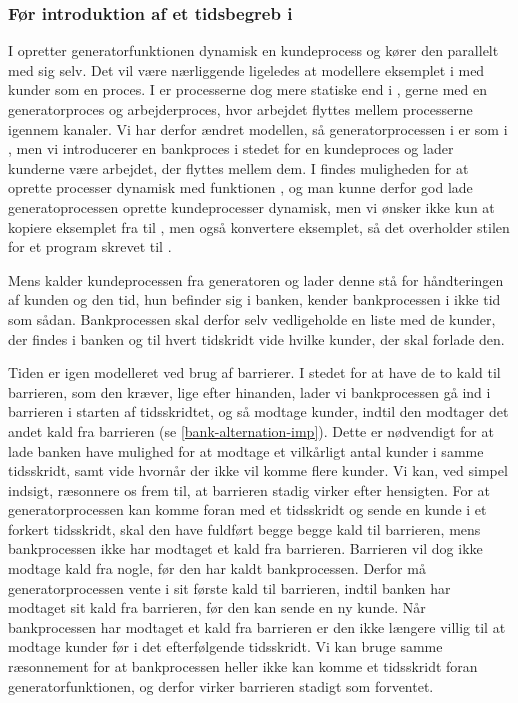\subsubsection{Før introduktion af et tidsbegreb i \pycsp}

I \simpy opretter generatorfunktionen dynamisk en kundeprocess og  kører den parallelt med sig selv. Det vil  være nærliggende ligeledes at 
modellere eksemplet i \pycsp med kunder som en proces. I \pycsp er processerne dog mere statiske end i \simpy, gerne med en generatorproces og 
arbejderproces, hvor  arbejdet flyttes 
mellem processerne igennem kanaler. Vi har derfor ændret modellen, så   
generatorprocessen i \pycsp er som i \simpy, men vi introducerer en bankproces i stedet for en kundeproces og lader kunderne være arbejdet, der flyttes mellem dem. 
I \pycsp findes muligheden for at oprette processer dynamisk med funktionen , og man kunne derfor god lade generatoprocessen oprette kundeprocesser dynamisk, men vi ønsker ikke kun at kopiere eksemplet fra \simpy til \pycsp, men også konvertere eksemplet, så det overholder stilen for et program skrevet til \csp. 

Mens \simpy kalder kundeprocessen fra generatoren og lader denne stå for håndteringen af kunden 
og den tid, hun befinder sig i banken, kender bankprocessen i \pycsp ikke tid som 
sådan. Bankprocessen skal derfor selv vedligeholde en liste med de kunder, der findes i banken og til hvert 
tidskridt vide hvilke kunder, der skal forlade den. 

Tiden er igen modelleret ved brug af barrierer. I 
stedet for at have de to kald til barrieren, som den kræver, lige efter hinanden, lader 
vi bankprocessen gå ind i barrieren i starten af tidsskridtet, og så modtage 
kunder, indtil den modtager det andet kald fra barrieren (se \cref{bank-alternation-imp}). Dette er nødvendigt for at lade banken have 
mulighed for at modtage et vilkårligt antal kunder i samme tidsskridt, samt 
vide hvornår der ikke vil komme flere kunder.  Vi kan, ved simpel indsigt, ræsonnere os frem til, at 
barrieren stadig virker efter hensigten.
For at generatorprocessen kan komme foran med et tidsskridt og sende en kunde i et forkert tidsskridt,
skal den have fuldført begge begge kald til barrieren, mens bankprocessen ikke 
har modtaget et kald fra barrieren. Barrieren vil dog ikke modtage kald fra 
nogle, før den har  kaldt bankprocessen. Derfor må generatorprocessen vente i 
sit første kald til barrieren, indtil banken har modtaget sit kald fra 
barrieren, før den kan sende en ny kunde.
Når bankprocessen har modtaget et kald fra barrieren er den ikke længere villig 
til at modtage kunder før i det efterfølgende tidsskridt. Vi kan bruge samme 
ræsonnement for at bankprocessen heller ikke kan komme et 
tidsskridt foran generatorfunktionen, og derfor virker barrieren stadigt som 
forventet. 

